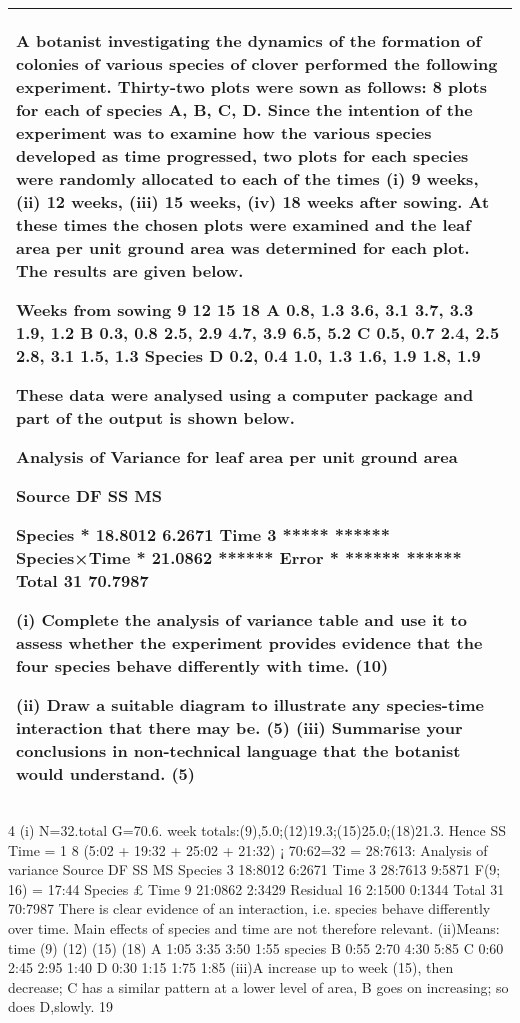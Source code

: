 \documentclass[a4paper,12pt]{article}
\begin{document}
\begin{table}[ht!]
 \centering
 \begin{tabular}{|p{15cm}|}
 \hline  
A botanist investigating the dynamics of the formation of colonies of various species of clover performed the following experiment.  Thirty-two plots were sown as follows: 8 plots for each of species A, B, C, D.  Since the intention of the experiment was to examine how the various species developed as time progressed, two plots for each species were randomly allocated to each of the times (i) 9 weeks, (ii) 12 weeks, (iii) 15 weeks, (iv) 18 weeks after sowing.  At these times the chosen plots were examined and the leaf area per unit ground area was determined for each plot.  The results are given below. 
 
  Weeks from sowing   9 12 15 18 A 0.8,  1.3 3.6,  3.1 3.7,  3.3 1.9,  1.2 B 0.3,  0.8 2.5,  2.9 4.7,  3.9 6.5,  5.2 C 0.5,  0.7 2.4,  2.5 2.8,  3.1 1.5,  1.3 Species D 0.2,  0.4 1.0,  1.3 1.6,  1.9 1.8,  1.9 
 
These data were analysed using a computer package and part of the output is shown below. 
 
Analysis of Variance for leaf area per unit ground area 
 
Source  DF        SS      MS 
 
Species    * 18.8012 6.2671 Time    3   *****   ****** Species×Time   * 21.0862  ****** Error    *   ******   ****** Total  31 70.7987 
 
 
(i) Complete the analysis of variance table and use it to assess whether the experiment provides evidence that the four species behave differently with time. (10) 
 
(ii) Draw a suitable diagram to illustrate any species-time interaction that there may be. (5) (iii) Summarise your conclusions in non-technical language that the botanist would understand. (5) \\ \hline
  \end{tabular}
\end{table}
\begin{enumerate}
4 (i) N=32.total G=70.6. week totals:(9),5.0;(12)19.3;(15)25.0;(18)21.3. Hence
SS Time =
1
8
(5:02 + 19:32 + 25:02 + 21:32) ¡ 70:62=32 = 28:7613:
Analysis of variance
Source DF SS MS
Species 3 18:8012 6:2671
Time 3 28:7613 9:5871 F(9; 16) = 17:44
Species £ Time 9 21:0862 2:3429
Residual 16 2:1500 0:1344
Total 31 70:7987
There is clear evidence of an interaction, i.e. species behave differently over time.
Main effects of species and time are not therefore relevant.
(ii)Means:
time (9) (12) (15) (18)
A 1:05 3:35 3:50 1:55
species B 0:55 2:70 4:30 5:85
C 0:60 2:45 2:95 1:40
D 0:30 1:15 1:75 1:85
(iii)A increase up to week (15), then decrease; C has a similar pattern at a lower
level of area, B goes on increasing; so does D,slowly.
19

\end{enumerate}
\end{document}
